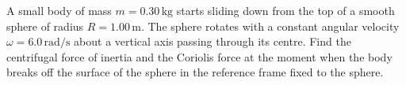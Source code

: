 \item A small body of mass \( m = 0.30 \, \text{kg} \) starts sliding down from the top of a smooth sphere of radius \( R = 1.00 \, \text{m} \). The sphere rotates with a constant angular velocity \( \omega = 6.0 \, \text{rad/s} \) about a vertical axis passing through its centre. Find the centrifugal force of inertia and the Coriolis force at the moment when the body breaks off the surface of the sphere in the reference frame fixed to the sphere.